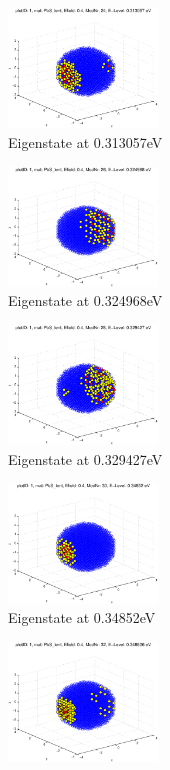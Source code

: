 \begin{figure}[htbp]
	\centering
	\begin{subfigure}{150px}
		\includegraphics[width=150px]{Fig/Plots/r25v04Mod24}
		\caption{Eigenstate at 0.313057eV}
	\end{subfigure}
	\begin{subfigure}{150px}
		\includegraphics[width=150px]{Fig/Plots/r25v04Mod26}
		\caption{Eigenstate at 0.324968eV}
	\end{subfigure}
	\begin{subfigure}{150px}
		\includegraphics[width=150px]{Fig/Plots/r25v04Mod28}
		\caption{Eigenstate at  0.329427eV}
	\end{subfigure}
	\begin{subfigure}{150px}
		\includegraphics[width=150px]{Fig/Plots/r25v04Mod30}
		\caption{Eigenstate at 0.34852eV}
	\end{subfigure}
	\begin{subfigure}{150px}
		\includegraphics[width=150px]{Fig/Plots/r25v04Mod32}

\end{subfigure}
\end{figure}
